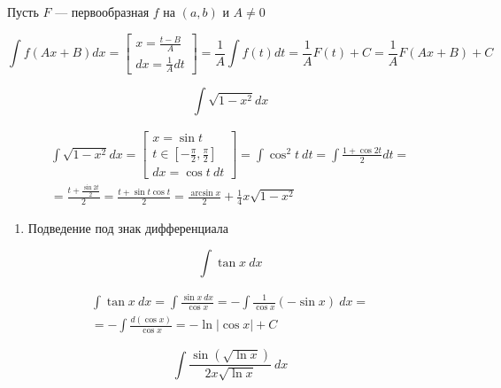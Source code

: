\begin{example}{}{}
    Пусть \( F \) --- первообразная \( f \) на \( (a, b) \) и \( A \neq 0 \)

    \[
        \int f(Ax + B) dx
        = \left[
            \begin{gathered}
                x = \frac{t - B}{A}
                \\
                dx = \frac{1}{A} dt
            \end{gathered}
        \right] =
        \frac{1}{A} \int f(t) dt = \frac{1}{A} F(t) + C = \frac{1}{A} F(Ax + B) + C
    \]
\end{example}

\newpage

\begin{example}{}{}
    \[
        \int \sqrt{1 - x^2} dx
\]
\end{example}

\begin{gather*}
    \int \sqrt{1 - x^2} dx
    = \left[
        \begin{gathered}
            x = \sin t
            \\
            t \in \left[ -\frac{\pi}{2}, \frac{\pi}{2} \right]
            \\
            dx = \cos t \: dt
        \end{gathered}
    \right] =
    \int \cos^2 t \: dt
    = 
    \int \frac{1 + \cos 2t}{2} dt
    =
    \\
    =
    \frac{t + \frac{\sin 2t}{2}}{2}
    =
    \frac{t + \sin t \cos t}{2}
    =
    \frac{\arcsin x}{2} + \frac{1}{4} x \sqrt{1 - x^2}
\end{gather*}

\begin{enumerate}
    \item[3.2]
        Подведение под знак дифференциала
\end{enumerate}

\begin{example}{}{}
    \[
        \int \tan x \: dx
    \]
\end{example}

\begin{gather*}
    \int \tan x \: dx
    =
    \int \frac{\sin x \: dx}{\cos x}
    =
    - \int \frac{1}{\cos x} (- \sin x) \: dx
    =
    \\
    =
    - \int \frac{d(\cos x)}{\cos x} = - \ln | \cos x | + C
\end{gather*}

\begin{example}{}{}
    \[
        \int \frac{\sin ( \sqrt{\ln x} ) }{2x \sqrt{\ln x}} \: dx
    \]
\end{example}

